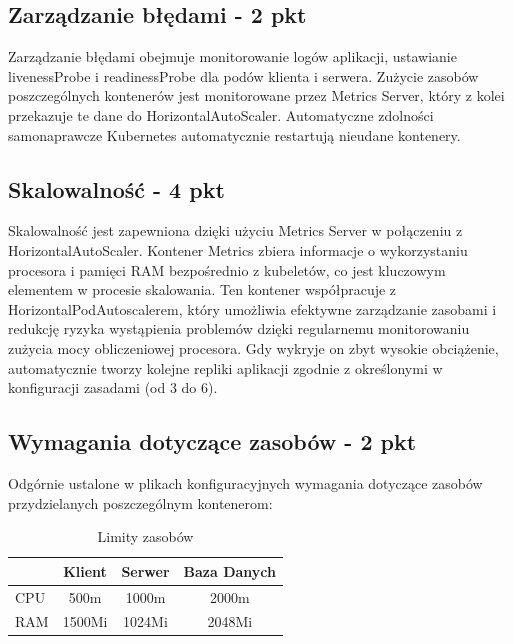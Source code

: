 \documentclass[12pt,a4paper]{article}
\begin{document}
\subsection{Zarządzanie błędami - 2 pkt}
\label{sec:ERD} 
Zarządzanie błędami obejmuje monitorowanie logów aplikacji, ustawianie livenessProbe i readinessProbe dla podów klienta i serwera. Zużycie zasobów poszczególnych kontenerów jest monitorowane przez Metrics Server, który z kolei przekazuje te dane do HorizontalAutoScaler. Automatyczne zdolności samonaprawcze Kubernetes automatycznie restartują nieudane kontenery.


\subsection{Skalowalność - 4 pkt}
\label{sec:ExamplesSection}
Skalowalność jest zapewniona dzięki użyciu Metrics Server w połączeniu z HorizontalAutoScaler. Kontener Metrics zbiera informacje o wykorzystaniu procesora i pamięci RAM bezpośrednio z kubeletów, co jest kluczowym elementem w procesie skalowania. Ten kontener współpracuje z HorizontalPodAutoscalerem, który umożliwia efektywne zarządzanie zasobami i redukcję ryzyka wystąpienia problemów dzięki regularnemu monitorowaniu zużycia mocy obliczeniowej procesora. Gdy wykryje on zbyt wysokie obciążenie, automatycznie tworzy kolejne repliki aplikacji zgodnie z określonymi w konfiguracji zasadami (od 3 do 6).
\subsection{Wymagania dotyczące zasobów - 2 pkt}
Odgórnie ustalone w plikach konfiguracyjnych wymagania dotyczące zasobów przydzielanych poszczególnym kontenerom:
\label{sec:ExampleResults}

\begin{table}[h!]
\centering
\begin{tabular}{|l|c|c|c|}
\hline
       & Klient & Serwer & Baza Danych \\ \hline
CPU    & 500m     & 1000m   & 2000m       \\ \hline
RAM    & 1500Mi   & 1024Mi  & 2048Mi      \\ \hline
\end{tabular}
\caption{Limity zasobów}
\label{tab:resource-limits}
\end{table}
\end{document}

